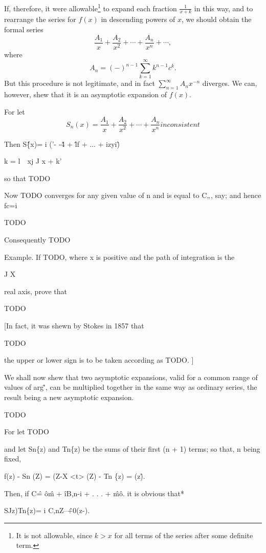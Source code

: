 If, therefore, it were allowable\footnote{It is not allowable, since
$k>x$ for all terms of the series after some definite term.} to expand
each fraction $\frac{1}{x+k}$ in this way, and to rearrange the series
for $f(x)$ in descending powers of $x$, we should obtain the formal
series
$$
\frac{A_{1}}{x} + \frac{A_{2}}{x^{2}} + \cdots + \frac{A_{n}}{x^{n}} +
\cdots,
$$
where
$$
A_{n} = (-)^{n-1} \sum_{k=1}^{\infty} k^{n-1} c^{k}.
$$
But this procedure is not legitimate, and in fact $\sum_{n=1}^{\infty}
A_{n} x^{-n}$ diverges. We can, however, shew that it is an asymptotic
expansion of $f(x)$.

For let
$$
S_{n}(x) = \frac{A_{1}}{x} + \frac{A_{2}}{x^{2}} + \cdots +
\frac{A_{n}}{x^{n}} %
inconsistent
$$

Then S\^\{x)= i ('- -\^4 + \^lf + ... + izyi\^)

k = l\ \ xj J x + k'

so that TODO

Now TODO converges for any given value of n and is equal to C„, say;
and hence fc=i

TODO

Consequently TODO

Example. If TODO, where x is positive and the path of integration is
the

J X

real axis, prove that

TODO

[In fact, it was shewn by Stokes in 1857 that

TODO

the upper or lower sign is to be taken according as TODO. ]

We shall now shew that two asymptotic expansions, valid for a common
range of values of arg\^', can be multiplied together in the same way
as ordinary series, the result being a new asymptotic expansion.

TODO

For let TODO

% 
% 
and let Sn\{z) and Tn\{z) be the sums of their first (n + 1) terms; so
that, n being fixed,

f(z) - Sn (Z) = (Z-X <t> (Z) - Tn \{z) = (z\^).

Then, if C\^ = \^o\^m + \^iB,n-i + . . . + \^m\^o. it is obvious that*

SJz)Tn\{z)= i C,nZ--\^+0(z-).

